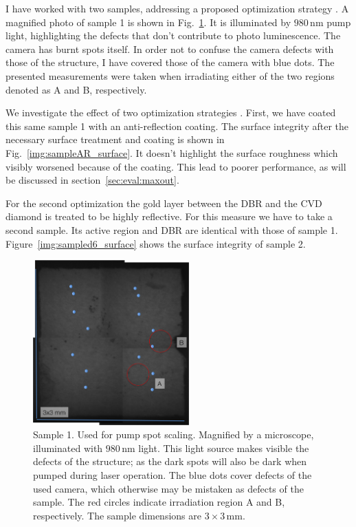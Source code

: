 I have worked with
two samples,
addressing a proposed optimization strategy
\cite{Hader2011}.
A magnified photo of
sample 1 is shown in Fig.~\ref{img:sample_surface}.
It is illuminated by $980\,\mathrm{nm}$ pump light,
highlighting the defects
that don't contribute to photo luminescence.
The camera has burnt spots itself.
In order not to confuse
the camera defects
with those of the structure,
I have covered those of the camera
with blue dots.
The presented measurements
were taken when irradiating
either of the two regions
denoted as A and B,
respectively.

We investigate the effect
of two optimization strategies
\cite{Hader2011}.
First, we have coated this same sample 1
with an anti-reflection coating.
The surface integrity
after the necessary
surface treatment
and coating
is shown in Fig.~\ref{img:sampleAR_surface}.
It doesn't highlight the surface roughness
which visibly worsened
because of the coating.
This lead to poorer performance,
as will be discussed
in section~\ref{sec:eval:maxout}.

For the second optimization
the gold layer between the DBR
and the CVD diamond
is treated to be highly reflective.
For this measure
we have to take a second sample.
Its active region and DBR
are identical
with those of sample 1.
Figure~\ref{img:sampled6_surface}
shows the surface integrity
of sample 2.

\begin{figure}
\centering
\includegraphics[width=6cm]{img/sample_surface.png}
\caption{Sample 1.
Used for pump spot scaling.
Magnified by a microscope,
illuminated with $980\,\mathrm{nm}$ light.
This light source makes visible
the defects of the structure;
as the dark spots will also be dark
when pumped during laser operation.
The blue dots cover defects
of the used camera,
which otherwise may be mistaken
as defects of the sample.
The red circles indicate
irradiation region A and B,
respectively.
The sample dimensions are $3\times3\,\mathrm{mm}$.}
\label{img:sample_surface}
\end{figure}

